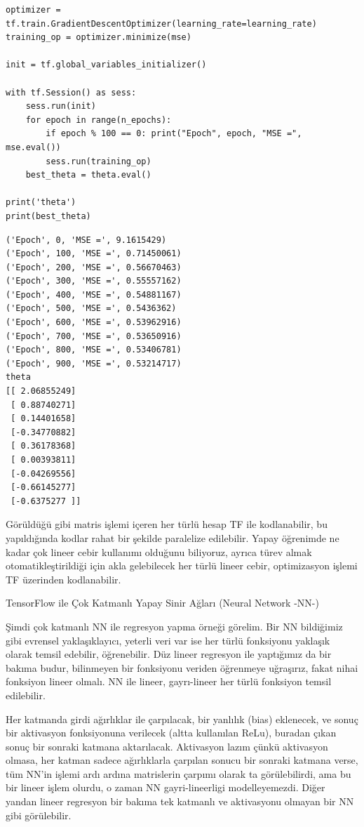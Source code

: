 \documentclass[12pt,fleqn]{article}\usepackage{../../common}
\begin{document}
\begin{verbatim}
optimizer = tf.train.GradientDescentOptimizer(learning_rate=learning_rate)
training_op = optimizer.minimize(mse)

init = tf.global_variables_initializer()

with tf.Session() as sess:
    sess.run(init)
    for epoch in range(n_epochs):
        if epoch % 100 == 0: print("Epoch", epoch, "MSE =", mse.eval())
        sess.run(training_op)    
    best_theta = theta.eval()

print('theta')
print(best_theta)
\end{verbatim}

\begin{verbatim}
('Epoch', 0, 'MSE =', 9.1615429)
('Epoch', 100, 'MSE =', 0.71450061)
('Epoch', 200, 'MSE =', 0.56670463)
('Epoch', 300, 'MSE =', 0.55557162)
('Epoch', 400, 'MSE =', 0.54881167)
('Epoch', 500, 'MSE =', 0.5436362)
('Epoch', 600, 'MSE =', 0.53962916)
('Epoch', 700, 'MSE =', 0.53650916)
('Epoch', 800, 'MSE =', 0.53406781)
('Epoch', 900, 'MSE =', 0.53214717)
theta
[[ 2.06855249]
 [ 0.88740271]
 [ 0.14401658]
 [-0.34770882]
 [ 0.36178368]
 [ 0.00393811]
 [-0.04269556]
 [-0.66145277]
 [-0.6375277 ]]
\end{verbatim}

Görüldüğü gibi matris işlemi içeren her türlü hesap TF ile kodlanabilir, bu
yapıldığında kodlar rahat bir şekilde paralelize edilebilir. Yapay
öğrenimde ne kadar çok lineer cebir kullanımı olduğunu biliyoruz, ayrıca
türev almak otomatikleştirildiği için akla gelebilecek her türlü lineer
cebir, optimizasyon işlemi TF üzerinden kodlanabilir.

TensorFlow ile Çok Katmanlı Yapay Sinir Ağları (Neural Network -NN-)

Şimdi çok katmanlı NN ile regresyon yapma örneği görelim. Bir NN bildiğimiz
gibi evrensel yaklaşıklayıcı, yeterli veri var ise her türlü fonksiyonu
yaklaşık olarak temsil edebilir, öğrenebilir. Düz lineer regresyon ile
yaptığımız da bir bakıma budur, bilinmeyen bir fonksiyonu veriden öğrenmeye
uğraşırız, fakat nihai fonksiyon lineer olmalı. NN ile lineer, gayrı-lineer
her türlü fonksiyon temsil edilebilir.

Her katmanda girdi ağırlıklar ile çarpılacak, bir yanlılık (bias)
eklenecek, ve sonuç bir aktivasyon fonksiyonuna verilecek (altta kullanılan
ReLu), buradan çıkan sonuç bir sonraki katmana aktarılacak. Aktivasyon
lazım çünkü aktivasyon olmasa, her katman sadece ağırlıklarla çarpılan
sonucu bir sonraki katmana verse, tüm NN'in işlemi ardı ardına matrislerin
çarpımı olarak ta görülebilirdi, ama bu bir lineer işlem olurdu, o zaman NN
gayri-lineerligi modelleyemezdi. Diğer yandan lineer regresyon bir bakıma
tek katmanlı ve aktivasyonu olmayan bir NN gibi görülebilir.
\end{document}
